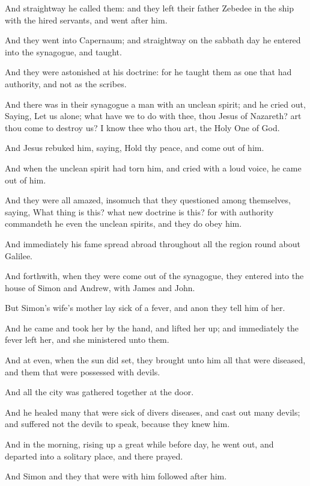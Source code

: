 \Verse And straightway he called them: and they left their father Zebedee in the ship with the hired servants, and went after him.

\Verse And they went into Capernaum; and straightway on the sabbath day he entered into the synagogue, and taught.

\Verse And they were astonished at his doctrine: for he taught them as one that had authority, and not as the scribes.

\Verse And there was in their synagogue a man with an unclean spirit; and he cried out, \Verse Saying, Let us alone; what have we to do with thee, thou Jesus of Nazareth? art thou come to destroy us? I know thee who thou art, the Holy One of God.

\Verse And Jesus rebuked him, saying, Hold thy peace, and come out of him.

\Verse And when the unclean spirit had torn him, and cried with a loud voice, he came out of him.

\Verse And they were all amazed, insomuch that they questioned among themselves, saying, What thing is this? what new doctrine is this? for with authority commandeth he even the unclean spirits, and they do obey him.

\Verse And immediately his fame spread abroad throughout all the region round about Galilee.

\Verse And forthwith, when they were come out of the synagogue, they entered into the house of Simon and Andrew, with James and John.

\Verse But Simon's wife's mother lay sick of a fever, and anon they tell him of her.

\Verse And he came and took her by the hand, and lifted her up; and immediately the fever left her, and she ministered unto them.

\Verse And at even, when the sun did set, they brought unto him all that were diseased, and them that were possessed with devils.

\Verse And all the city was gathered together at the door.

\Verse And he healed many that were sick of divers diseases, and cast out many devils; and suffered not the devils to speak, because they knew him.

\Verse And in the morning, rising up a great while before day, he went out, and departed into a solitary place, and there prayed.

\Verse And Simon and they that were with him followed after him.

